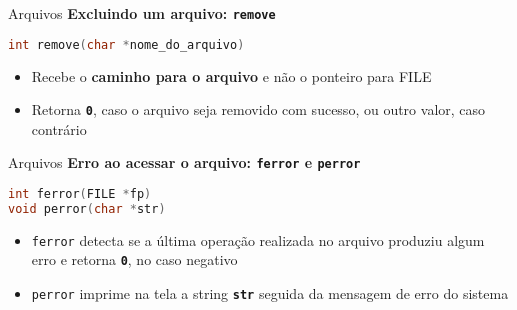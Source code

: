 \documentclass[10pt]{beamer}
\begin{document}
\begin{frame}[fragile]{Arquivos}
  \huge
  \textbf{Excluindo um arquivo: \texttt{remove}}
  \vfill
  \large
  \begin{lstlisting}[language=C]
int remove(char *nome_do_arquivo)
  \end{lstlisting}
  \vfill
  \setlength{\leftmargini}{0pt}
  \begin{itemize}
      \item [] Recebe o \textbf{caminho para o arquivo} e não o ponteiro para FILE
      \item [] Retorna \texttt{\textbf{0}}, caso o arquivo seja removido com sucesso, ou outro valor, caso contrário
  \end{itemize}
\end{frame}

\begin{frame}[fragile]{Arquivos}
  \huge
  \textbf{Erro ao acessar o arquivo: \texttt{ferror} e \texttt{perror}}
  \vfill
  \large
  \begin{lstlisting}[language=C]
int ferror(FILE *fp)
void perror(char *str)
  \end{lstlisting}
  \vfill
  \setlength{\leftmargini}{0pt}
  \begin{itemize}
      \item [] \texttt{ferror} detecta se a última operação realizada no arquivo produziu algum erro e retorna \texttt{\textbf{0}}, no caso negativo
      \item [] \texttt{perror} imprime na tela a string \textbf{\texttt{str}} seguida da mensagem de erro do sistema
  \end{itemize}
\end{frame}
\end{document}
